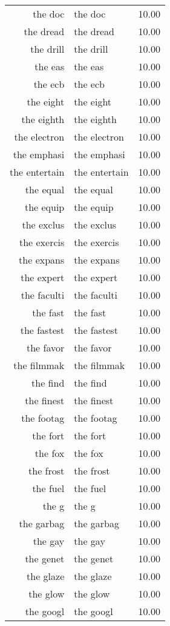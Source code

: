\begin{table}[ht]
\begin{tabular}{rlr}
  the doc & the doc & 10.00 \\ 
  the dread & the dread & 10.00 \\ 
  the drill & the drill & 10.00 \\ 
  the eas & the eas & 10.00 \\ 
  the ecb & the ecb & 10.00 \\ 
  the eight & the eight & 10.00 \\ 
  the eighth & the eighth & 10.00 \\ 
  the electron & the electron & 10.00 \\ 
  the emphasi & the emphasi & 10.00 \\ 
  the entertain & the entertain & 10.00 \\ 
  the equal & the equal & 10.00 \\ 
  the equip & the equip & 10.00 \\ 
  the exclus & the exclus & 10.00 \\ 
  the exercis & the exercis & 10.00 \\ 
  the expans & the expans & 10.00 \\ 
  the expert & the expert & 10.00 \\ 
  the faculti & the faculti & 10.00 \\ 
  the fast & the fast & 10.00 \\ 
  the fastest & the fastest & 10.00 \\ 
  the favor & the favor & 10.00 \\ 
  the filmmak & the filmmak & 10.00 \\ 
  the find & the find & 10.00 \\ 
  the finest & the finest & 10.00 \\ 
  the footag & the footag & 10.00 \\ 
  the fort & the fort & 10.00 \\ 
  the fox & the fox & 10.00 \\ 
  the frost & the frost & 10.00 \\ 
  the fuel & the fuel & 10.00 \\ 
  the g & the g & 10.00 \\ 
  the garbag & the garbag & 10.00 \\ 
  the gay & the gay & 10.00 \\ 
  the genet & the genet & 10.00 \\ 
  the glaze & the glaze & 10.00 \\ 
  the glow & the glow & 10.00 \\ 
  the googl & the googl & 10.00 \\ 

\end{tabular}
\end{table}
